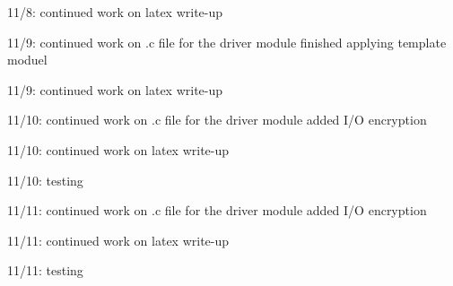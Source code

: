 \documentclass[onecolumn, draftclsnofoot,10pt, compsoc]{IEEEtran}
\begin{document}
	11/8: continued work on latex write-up
	
	11/9: continued work on .c file for the driver module finished applying template moduel
	
	11/9: continued work on latex write-up
	
	11/10: continued work on .c file for the driver module added I/O encryption
	
	11/10: continued work on latex write-up
	
	11/10: testing
	
	11/11: continued work on .c file for the driver module added I/O encryption
	
	11/11: continued work on latex write-up
	
	11/11: testing
	
\end{document}
